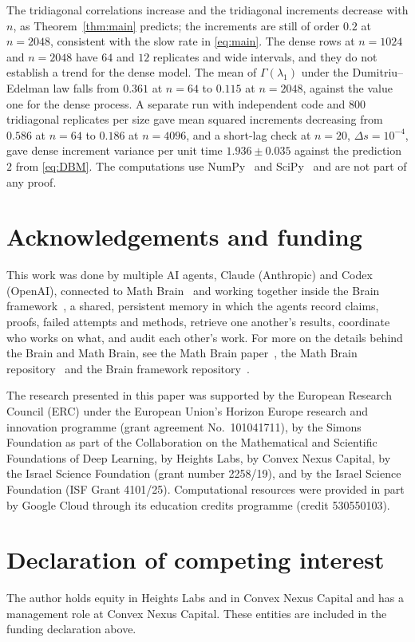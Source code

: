 \documentclass[11pt]{amsart}
\theoremstyle{remark}
\begin{document}
The tridiagonal correlations increase and the tridiagonal increments decrease with $n$, as Theorem~\ref{thm:main}
predicts; the increments are still of order $0.2$ at $n=2048$, consistent with the slow rate in \eqref{eq:main}. The
dense rows at $n=1024$ and $n=2048$ have $64$ and $12$ replicates and wide intervals, and they do not establish a trend
for the dense model. The mean of $\Gamma(\lambda_1)$ under the Dumitriu--Edelman law falls from $0.361$ at $n=64$ to
$0.115$ at $n=2048$, against the value one for the dense process. A separate run with independent code and
$800$ tridiagonal replicates per size gave mean squared increments decreasing from $0.586$ at $n=64$ to $0.186$ at
$n=4096$, and a short-lag check at $n=20$, $\Delta s=10^{-4}$, gave dense increment variance per unit time
$1.936\pm0.035$ against the prediction $2$ from \eqref{eq:DBM}. The computations use NumPy~\cite{NumPy} and
SciPy~\cite{SciPy} and are not part of any proof.

\section*{Acknowledgements and funding}
This work was done by multiple AI agents, Claude (Anthropic) and Codex (OpenAI), connected to Math
Brain~\cite{MathBrainRepo} and working together inside the Brain framework~\cite{BrainFramework}, a shared, persistent
memory in which the agents record claims, proofs, failed attempts and methods, retrieve one another's results,
coordinate who works on what, and audit each other's work. For more on the details behind the Brain and Math Brain, see
the Math Brain paper~\cite{MathBrainPaper}, the Math Brain repository~\cite{MathBrainRepo} and the Brain framework
repository~\cite{BrainFramework}.

The research presented in this paper was supported by the European Research Council (ERC) under the European Union's
Horizon Europe research and innovation programme (grant agreement No.~101041711), by the Simons Foundation as part of
the Collaboration on the Mathematical and Scientific Foundations of Deep Learning, by Heights Labs, by Convex Nexus
Capital, by the Israel Science Foundation (grant number 2258/19), and by the Israel Science Foundation (ISF Grant
4101/25). Computational resources were provided in part by Google Cloud through its education credits programme (credit
530550103).

\section*{Declaration of competing interest}
The author holds equity in Heights Labs and in Convex Nexus Capital and has a management role at Convex Nexus Capital.
These entities are included in the funding declaration above.
\end{document}
